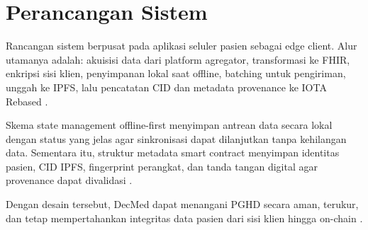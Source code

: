 \section{Perancangan Sistem}

Rancangan sistem berpusat pada aplikasi seluler pasien sebagai edge client. Alur utamanya adalah: akuisisi data dari platform agregator, transformasi ke FHIR, enkripsi sisi klien, penyimpanan lokal saat offline, batching untuk pengiriman, unggah ke IPFS, lalu pencatatan CID dan metadata provenance ke IOTA Rebased \parencite{Google_Fit_2025,HL7_FHIR_2025,Akbulut_2026,Qin_2016}.

Skema state management offline-first menyimpan antrean data secara lokal dengan status yang jelas agar sinkronisasi dapat dilanjutkan tanpa kehilangan data. Sementara itu, struktur metadata smart contract menyimpan identitas pasien, CID IPFS, fingerprint perangkat, dan tanda tangan digital agar provenance dapat divalidasi \parencite{Purnama_2025,IOTA_Rebased_2025}.

Dengan desain tersebut, DecMed dapat menangani PGHD secara aman, terukur, dan tetap mempertahankan integritas data pasien dari sisi klien hingga on-chain \parencite{Mars_Scott_2022,Akbulut_2026}.